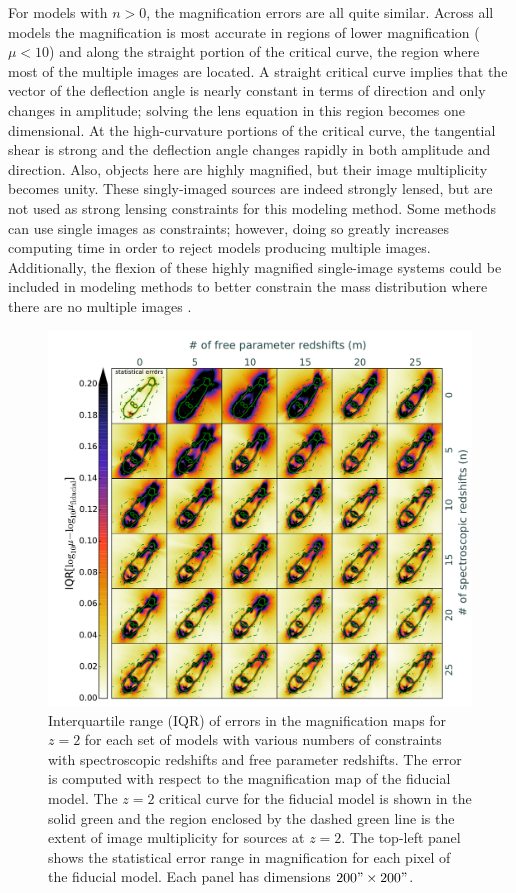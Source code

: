 For models with $n>0$, the magnification errors are all quite similar. Across all models the magnification is most accurate in regions of lower magnification ($\mu<10$) and along the straight portion of the critical curve, the region where most of the multiple images are located. A straight critical curve implies that the vector of the deflection angle is nearly constant in terms of direction and only changes in amplitude; solving the lens equation in this region becomes one dimensional. At the high-curvature portions of the critical curve, the tangential shear is strong and the deflection angle changes rapidly in both amplitude and direction. Also, objects here are highly magnified, but their image multiplicity becomes unity. These singly-imaged sources are indeed strongly lensed, but are not used as strong lensing constraints for this modeling method. Some methods can use single images as constraints; however, doing so greatly increases computing time in order to reject models producing multiple images. Additionally, the flexion of these highly magnified single-image systems could be included in modeling methods to better constrain the mass distribution where there are no multiple images \citep[ex.,][]{Cain:2011ab}.

\begin{figure}
\center
\includegraphics[width=1.0\textwidth]{Chap3/c3f7.pdf}
\caption[Range of error in magnifications of test models]{Interquartile range (IQR) of errors in the magnification maps for $z=2$ for each set of models with various numbers of constraints with spectroscopic redshifts and free parameter redshifts. The error is computed with respect to the magnification map of the fiducial model. The $z=2$ critical curve for the fiducial model is shown in the solid green and the region enclosed by the dashed green line is the extent of image multiplicity for sources at $z=2$. The top-left panel shows the statistical error range in magnification for each pixel of the fiducial model. Each panel has dimensions $200"\times200"$.}
\label{chap3:fig:magnification_spread}
\end{figure}

